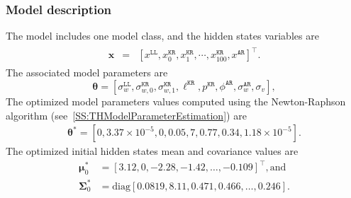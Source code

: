 \subsubsection{Model description}
\label{SS:ModelConstructionExampleTraffic}

The model includes one model class, and the hidden states variables are 
\begin{gather*}
\begin{array}{rcl}
\mathbf{x} &=& \left[x^{\mathtt{LL}}, x_{0}^{\mathtt{KR}}, x_{1}^{\mathtt{KR}},\cdots,x_{100}^{\mathtt{KR}}, x^{\mathtt{AR}}\right]^{\intercal}.
\end{array}
\end{gather*}
The associated model parameters are
\begin{equation}
\label{EQ:PTL}
\bm\theta = \left[\sigma^{\mathtt{LL}}_{w}, \sigma_{w,0}^{\mathtt{KR}}, \sigma_{w,1}^{\mathtt{KR}}, \ell^{\mathtt{KR}}, p^{\mathtt{KR}}, \phi^{\mathtt{AR}}, \sigma^{\mathtt{AR}}_{w}, \sigma_{v}\right],
\end{equation}
The optimized model parameters values computed using the Newton-Raphson algorithm (see~\ref{SS:THModelParameterEstimation}) are
\begin{gather*}
\bm\theta^{\text{*}}=[0 , 3.37\times10^{-5}, 0, 0.05, 7, 0.77, 0.34, 1.18\times10^{-5}].
\end{gather*}
The optimized initial hidden states mean and covariance values are 
\begin{align*}
\bm \mu^{*}_{0} & = [	 3.12  ,	0  ,   	-2.28  ,	-1.42 ,	\dots, -0.109]^{\intercal}, \text{and} \\
\bm\Sigma^{*}_{0} & = \text{diag}[   0.0819,	8.11,  0.471 ,	0.466, \dots, 0.246 ].
 \end{align*}
